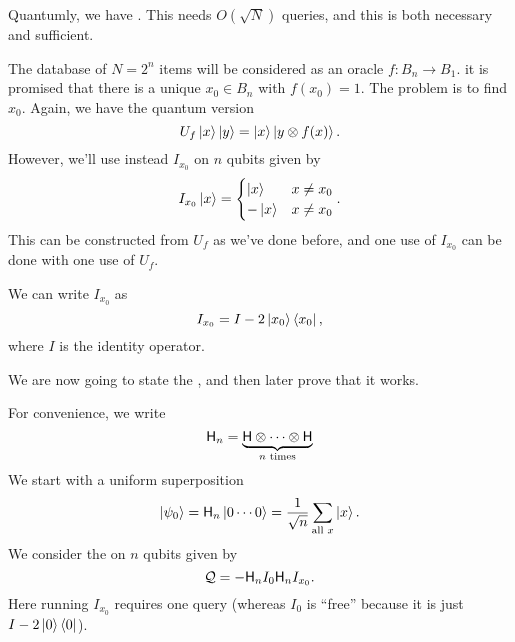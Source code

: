 Quantumly, we have . This needs $O(\sqrt{N})$ queries, and this is both necessary and sufficient.

The database of $N = 2^n$ items will be considered as an oracle $f: B_n \to B_1$. it is promised that there is a unique $x_0 \in B_n$ with $f(x_0) = 1$. The problem is to find $x_0$. Again, we have the quantum version
\[
  U_f \left\lvert x\right\rangle\left\lvert y\right\rangle = \left\lvert x\right\rangle \left\lvert y \otimes f(x)\right\rangle.
\]
However, we'll use instead $I_{x_0}$ on $n$ qubits given by
\[
  I_{x_0}\left\lvert x\right\rangle =
  \begin{cases}
    \left\lvert x\right\rangle & x \not= x_0\\
    -\left\lvert x\right\rangle & x \not= x_0
  \end{cases}.
\]
This can be constructed from $U_f$ as we've done before, and one use of $I_{x_0}$ can be done with one use of $U_f$.
\begin{center}
\end{center}
We can write $I_{x_0}$ as
\[
  I_{x_0} = I - 2 \left\lvert x_0\right\rangle \left\langle x_0 \right\rvert,
\]
where $I$ is the identity operator.

We are now going to state the , and then later prove that it works.

For convenience, we write
\[
  \mathsf{H}_n = \underbrace{\mathsf{H} \otimes \cdots \otimes \mathsf{H}}_{n\text{ times}}
\]
We start with a uniform superposition
\[
  \left\lvert \psi_0\right\rangle = \mathsf{H}_n \left\lvert 0\cdots0\right\rangle = \frac{1}{\sqrt{n}} \sum_{\text{all }x} \left\lvert x\right\rangle.
\]
We consider the  on $n$ qubits given by
\[
  \mathcal{Q} = -\mathsf{H}_n I_0 \mathsf{H}_n I_{x_0}.
\]
Here running $I_{x_0}$ requires one query (whereas $I_0$ is ``free'' because it is just $I - 2 \left\lvert 0\right\rangle\left\langle 0 \right\rvert$).

